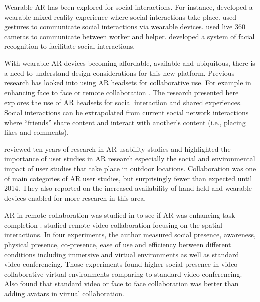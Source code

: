 Wearable AR has been explored for social interactions. For instance, \textcite{Cheok2002a} developed a wearable mixed reality experience where social interactions take place. \textcite{Amores2015} used gestures to communicate social interactions via wearable devices. \textcite{Lee2019} used live 360 cameras to communicate between worker and helper. \textcite{Shu2018} developed a system of facial recognition to facilitate social interactions. 

With wearable AR devices becoming affordable, available and ubiquitous, there is a need to understand design considerations for this new platform. Previous research has looked into using AR headsets for collaborative use. For example in enhancing face to face \cite{Billinghurst2002} or remote collaboration \cite{Gupta2016}. The research presented here explores the use of AR headsets for social interaction and shared experiences. Social interactions can be extrapolated from current social network interactions where \enquote{friends} share content and interact with another's content (i.e., placing likes and comments).

\textcite{Dey2018} reviewed ten years of research in AR usability studies and highlighted the importance of user studies in AR research especially the social and environmental impact of user studies that take place in outdoor locations. Collaboration was one of main categories of AR user studies, but surprisingly  fewer than expected until 2014. They also reported on the increased availability of hand-held and wearable devices enabled for more research in this area. 

AR in remote collaboration was studied in to see if AR was enhancing task completion \cite{Kim2014, Tversky2015, Gupta2016, Kim2015}.
\textcite{hauber2008understanding} studied remote video collaboration focusing on the spatial interactions. In four experiments, the author measured social presence, awareness, physical presence, co-presence, ease of use and efficiency between different conditions including immersive and virtual environments as well as standard video conferencing. Those experiments found higher social presence in video collaborative virtual environments comparing to standard video conferencing. Also found that standard video or face to face collaboration was better than adding avatars in virtual collaboration.


